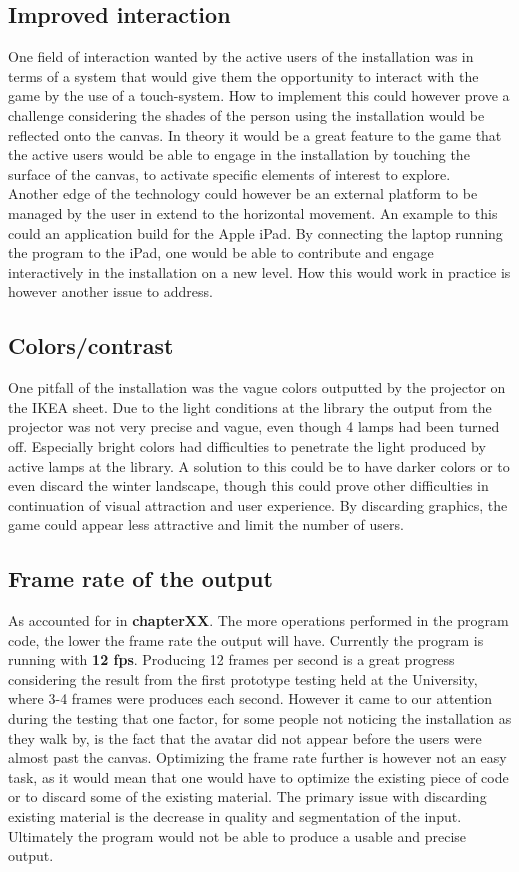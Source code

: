 \subsection{Improved interaction}
One field of interaction wanted by the active users of the installation was in terms of a system that would give them the opportunity to interact with the game by the use of a touch-system. How to implement this could however prove a challenge considering the shades of the person using the installation would be reflected onto the canvas. In theory it would be a great feature to the game that the active users would be able to engage in the installation by touching the surface of the canvas, to activate specific elements of interest to explore.\\
Another edge of the technology could however be an external platform to be managed by the user in extend to the horizontal movement. An example to this could an application build for the Apple iPad. By connecting the laptop running the program to the iPad, one would be able to contribute and engage interactively in the installation on a new level. How this would work in practice is however another issue to address. 

\subsection{Colors/contrast}
One pitfall of the installation was the vague colors outputted by the projector on the IKEA sheet. Due to the light conditions at the library the output from the projector was not very precise and vague, even though 4 lamps had been turned off. Especially bright colors had difficulties to penetrate the light produced by active lamps at the library. A solution to this could be to have darker colors or to even discard the winter landscape, though this could prove other difficulties in continuation of visual attraction and user experience. By discarding graphics, the game could appear less attractive and limit the number of users.
 
\subsection{Frame rate of the output}
As accounted for in \textbf{chapterXX}. The more operations performed in the program code, the lower the frame rate the output will have. Currently the program is running with \textbf{12 fps}. Producing 12 frames per second is a great progress considering the result from the first prototype testing held at the University, where 3-4 frames were produces each second. However it came to our attention during the testing that one factor, for some people not noticing the installation as they walk by, is the fact that the avatar did not appear before the users were almost past the canvas. Optimizing the frame rate further is however not an easy task, as it would mean that one would have to optimize the existing piece of code or to discard some of the existing material. The primary issue with discarding existing material is the decrease in quality and segmentation of the input. Ultimately the program would not be able to produce a usable and precise output.   

